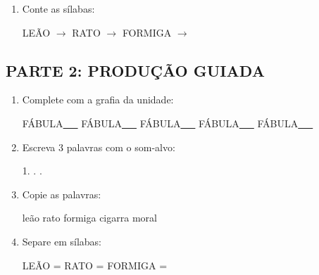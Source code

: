 \begin{exercicio}
\begin{enumerate}
  \item Conte as sílabas:
  \begin{center}
  LEÃO $\rightarrow$ \underline{\hspace{0.9cm}} \quad RATO $\rightarrow$ \underline{\hspace{0.9cm}} \quad FORMIGA $\rightarrow$ \underline{\hspace{0.9cm}}
  \end{center}

\end{enumerate}

\subsection*{PARTE 2: PRODUÇÃO GUIADA}

\begin{enumerate}[resume]

  \item Complete com a grafia da unidade:
  \begin{center}
  FÁBULA\underline{~~~} \quad FÁBULA\underline{~~~} \quad FÁBULA\underline{~~~} \quad FÁBULA\underline{~~~} \quad FÁBULA\underline{~~~}
  \end{center}

  \item Escreva 3 palavras com o som-alvo:
  \begin{center}
  1. \underline{\hspace{3cm}} . \underline{\hspace{3cm}} . \underline{\hspace{3cm}}
  \end{center}

  \item Copie as palavras:
  \begin{center}
  leão \quad rato \quad formiga \quad cigarra \quad moral
  \end{center}

  \item Separe em sílabas:
  \begin{center}
  LEÃO = \underline{\hspace{1cm}} \underline{\hspace{1cm}} \quad RATO = \underline{\hspace{1cm}} \underline{\hspace{1cm}} \quad FORMIGA = \underline{\hspace{1cm}} \underline{\hspace{1cm}}
  \end{center}


\end{enumerate}
\end{exercicio}
